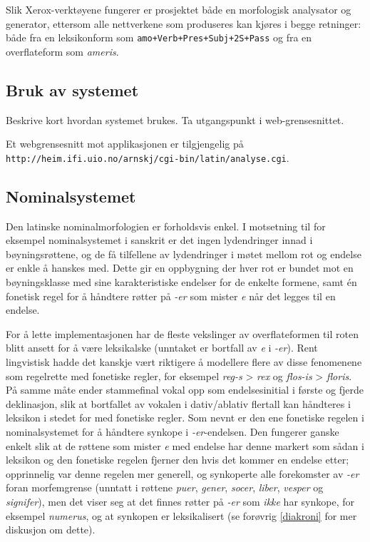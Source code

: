 \documentclass{article}
\newcommand\form[1]{\texttt{#1}}
\newcommand\note[1]{\marginpar{\raggedright\tiny#1}}
\newcommand\w[1]{\emph{#1}}
\begin{document}
Slik Xerox-verkt\o{}yene fungerer er prosjektet b\aa{}de en morfologisk
analysator og generator, ettersom alle nettverkene som produseres kan
kj\o{}res i begge retninger: b\aa{}de fra en leksikonform som
\form{amo+Verb+Pres+Subj+2S+Pass} og fra en overflateform som \w{ameris}.

\subsection{Bruk av systemet}
Beskrive kort hvordan systemet brukes. Ta utgangspunkt i web-grensesnittet.

Et webgrensesnitt mot applikasjonen er tilgjengelig p\aa{}
\texttt{http://heim.ifi.uio.no/arnskj/cgi-bin/latin/analyse.cgi}.

\subsection{Nominalsystemet}
\label{deklinasjon}
Den latinske nominalmorfologien er forholdsvis enkel. I motsetning til for
eksempel nominalsystemet i sanskrit er det ingen lydendringer innad i
b\o{}yningsr\o{}ttene, og de f\aa{} tilfellene av lydendringer i m\o{}tet
mellom rot og endelse er enkle \aa{} hanskes med. Dette gir en oppbygning der
hver rot er bundet mot en b\o{}yningsklasse med sine karakteristiske endelser
for de enkelte formene, samt \'en fonetisk regel for \aa{} h\aa{}ndtere
r\o{}tter p\aa{} \w{-er} som mister \w{e} n\aa{}r det legges til en endelse.

For \aa{} lette implementasjonen har de fleste vekslinger av overflateformen
til roten blitt ansett for \aa{} v\ae{}re leksikalske (unntaket er bortfall av
\w{e} i \w{-er}). Rent lingvistisk hadde det kanskje v\ae{}rt riktigere \aa{}
modellere flere av disse fenomenene som regelrette med fonetiske regler, for
eksempel \w{reg-s} > \w{rex} og \w{flos-is} > \w{floris}. P\aa{} samme
m\aa{}te ender stammefinal vokal opp som endelsesinitial i f\o{}rste og fjerde
deklinasjon, slik at bortfallet av vokalen i dativ/ablativ flertall kan
h\aa{}ndteres i leksikon i stedet for med fonetiske regler. Som nevnt er den
ene fonetiske regelen i nominalsystemet for \aa{} h\aa{}ndtere
synkope\note{Synkope er riktig, no?} i \w{-er}-endelsen. Den fungerer ganske
enkelt slik at de r\o{}ttene som mister \w{e} med endelse har denne markert
som s\aa{}dan i leksikon og den fonetiske regelen fjerner den hvis det kommer
en endelse etter; opprinnelig var denne regelen mer generell, og synkoperte
alle forekomster av \w{-er} foran morfemgrense (unntatt i r\o{}ttene \w{puer},
\w{gener}, \w{socer}, \w{liber}, \w{vesper} og \w{signifer}), men det viser
seg at det finnes r\o{}tter p\aa{} \w{-er} som \emph{ikke} har synkope, for
eksempel \w{numerus}, og at synkopen er leksikalisert (se for\o{}vrig
\ref{diakroni} for mer diskusjon om dette).
\end{document}
